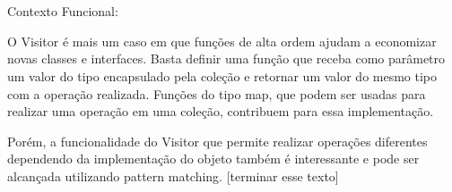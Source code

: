 \begin{lstlisting}[caption={Visitor Orientação a Objetos},label=oovisitor]



\end{lstlisting}

Contexto Funcional:

O Visitor é mais um caso em que funções de alta ordem ajudam a 
economizar novas classes e interfaces. Basta definir uma função 
que receba como parâmetro um valor do tipo encapsulado pela 
coleção e retornar um valor do mesmo tipo com a operação 
realizada. Funções do tipo map, que podem ser usadas para 
realizar uma operação em uma coleção, contribuem para essa 
implementação.

Porém, a funcionalidade do Visitor que permite realizar 
operações diferentes dependendo da implementação do objeto 
também é interessante e pode ser alcançada utilizando 
pattern matching. [terminar esse texto]

\begin{lstlisting}[caption={Visitor Funcional},label=fpvisitor]
    

    
\end{lstlisting}